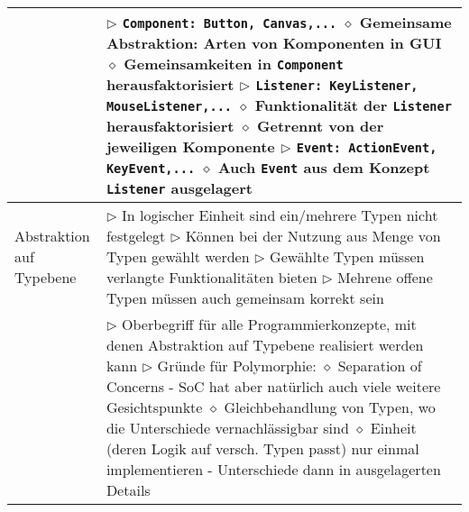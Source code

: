 \begin{longtable}{ | p{} p{} | }
	\makecell[l]{Beispiel Java} & \makecell[l]{
	$\triangleright$ \texttt{Component: Button, Canvas,...} \\
	\hspace{0.4cm} $\diamond$ Gemeinsame Abstraktion: Arten von Komponenten in GUI \\
	\hspace{0.4cm} $\diamond$ Gemeinsamkeiten in \texttt{Component} herausfaktorisiert \\
	$\triangleright$ \texttt{Listener: KeyListener, MouseListener,...} \\
	\hspace{0.4cm} $\diamond$ Funktionalität der \texttt{Listener} herausfaktorisiert \\
	\hspace{0.4cm} $\diamond$ Getrennt von der jeweiligen Komponente \\
	$\triangleright$ \texttt{Event: ActionEvent, KeyEvent,...} \\
	\hspace{0.4cm} $\diamond$ Auch \texttt{Event} aus dem Konzept \texttt{Listener} ausgelagert } \\ \hline

	\makecell[l]{Abstraktion auf \\ Typebene} & \makecell[l]{
	$\triangleright$ In logischer Einheit sind ein/mehrere Typen nicht festgelegt \\
	$\triangleright$ Können bei der Nutzung aus Menge von Typen gewählt werden \\
	$\triangleright$ Gewählte Typen müssen verlangte Funktionalitäten bieten \\
	$\triangleright$ Mehrene offene Typen müssen auch gemeinsam korrekt sein} \\ \hline

	\makecell[l]{Polymorphie} & \makecell[l]{
	$\triangleright$ Oberbegriff für alle Programmierkonzepte, mit denen Abstraktion auf \\
	\hspace{0.3cm} Typebene realisiert werden kann \\
	$\triangleright$ Gründe für Polymorphie: \\
	\hspace{0.4cm} $\diamond$ Separation of Concerns \\
	\hspace{0.6cm} - SoC hat aber natürlich auch viele weitere Gesichtspunkte \\
	\hspace{0.4cm} $\diamond$ Gleichbehandlung von Typen, wo die Unterschiede vernachlässigbar sind \\
	\hspace{0.4cm} $\diamond$ Einheit (deren Logik auf versch. Typen passt) nur einmal implementieren \\
	\hspace{0.6cm} - Unterschiede dann in ausgelagerten Details} \\ \hline


\end{longtable}
